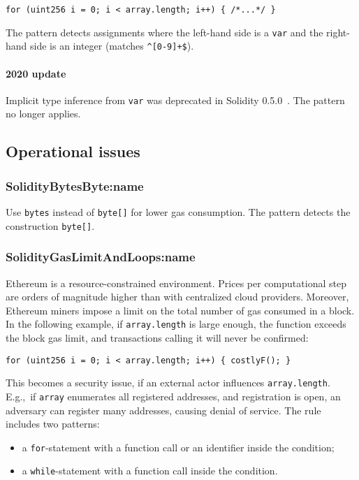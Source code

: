 \begin{lstlisting}[language=Solidity]
for (uint256 i = 0; i < array.length; i++) { /*...*/ }
\end{lstlisting}

The pattern detects assignments where the left-hand side is a \texttt{var} and the right-hand side is an integer (matches \texttt{\^{}[0-9]+\$}).

\paragraph{2020 update}
Implicit type inference from \texttt{var} was deprecated in Solidity 0.5.0~\cite{Solidity050}.
The pattern no longer applies.

\subsection{Operational issues} \label{sec:OperationalIssues}

\subsubsection{\usevalue SolidityBytesByte:name } \label{SolidityBytesByte}

Use \texttt{bytes} instead of \texttt{byte[]} for lower gas consumption.
The pattern detects the construction \texttt{byte[]}.

\subsubsection{\usevalue SolidityGasLimitAndLoops:name } \label{SolidityGasLimitAndLoops}

Ethereum is a resource-constrained environment.
Prices per computational step are orders of magnitude higher than with centralized cloud providers.
Moreover, Ethereum miners impose a limit on the total number of gas consumed in a block.
In the following example, if \texttt{array.length} is large enough, the function exceeds the block gas limit, and transactions calling it will never be confirmed:

\begin{lstlisting}[language=Solidity]
for (uint256 i = 0; i < array.length; i++) { costlyF(); }
\end{lstlisting}

This becomes a security issue, if an external actor influences \texttt{array.length}.
E.g.,~if \texttt{array} enumerates all registered addresses, and registration is open, an adversary can register many addresses, causing denial of service.
The rule includes two patterns:
\begin{itemize}
	\item a \texttt{for}-statement with a function call or an identifier inside the condition;
	\item a \texttt{while}-statement with a function call inside the condition.
\end{itemize}

